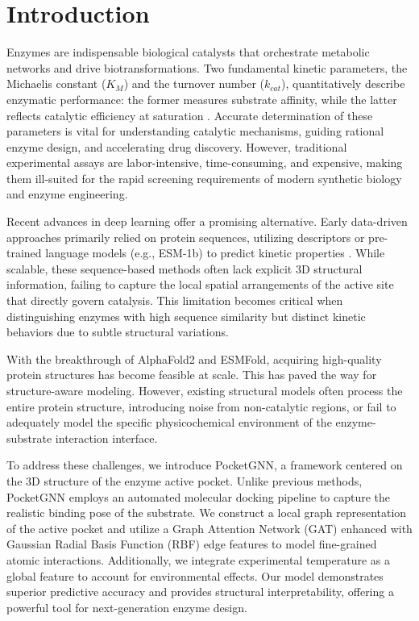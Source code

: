 \documentclass[11pt, a4paper]{article}
\begin{document}
\section{Introduction}
\label{sec:intro}

Enzymes are indispensable biological catalysts that orchestrate metabolic networks and drive biotransformations. Two fundamental kinetic parameters, the Michaelis constant ($K_M$) and the turnover number ($k_{cat}$), quantitatively describe enzymatic performance: the former measures substrate affinity, while the latter reflects catalytic efficiency at saturation \cite{srinivasan2023guide}. Accurate determination of these parameters is vital for understanding catalytic mechanisms, guiding rational enzyme design, and accelerating drug discovery. However, traditional experimental assays are labor-intensive, time-consuming, and expensive, making them ill-suited for the rapid screening requirements of modern synthetic biology and enzyme engineering.

Recent advances in deep learning offer a promising alternative. Early data-driven approaches primarily relied on protein sequences, utilizing descriptors or pre-trained language models (e.g., ESM-1b) to predict kinetic properties \cite{kroll2021deep, yu2023unikp}. While scalable, these sequence-based methods often lack explicit 3D structural information, failing to capture the local spatial arrangements of the active site that directly govern catalysis. This limitation becomes critical when distinguishing enzymes with high sequence similarity but distinct kinetic behaviors due to subtle structural variations.

With the breakthrough of AlphaFold2 and ESMFold, acquiring high-quality protein structures has become feasible at scale. This has paved the way for structure-aware modeling. However, existing structural models often process the entire protein structure, introducing noise from non-catalytic regions, or fail to adequately model the specific physicochemical environment of the enzyme-substrate interaction interface.

To address these challenges, we introduce PocketGNN, a framework centered on the 3D structure of the enzyme active pocket. Unlike previous methods, PocketGNN employs an automated molecular docking pipeline to capture the realistic binding pose of the substrate. We construct a local graph representation of the active pocket and utilize a Graph Attention Network (GAT) enhanced with Gaussian Radial Basis Function (RBF) edge features to model fine-grained atomic interactions. Additionally, we integrate experimental temperature as a global feature to account for environmental effects. Our model demonstrates superior predictive accuracy and provides structural interpretability, offering a powerful tool for next-generation enzyme design.
\end{document}
